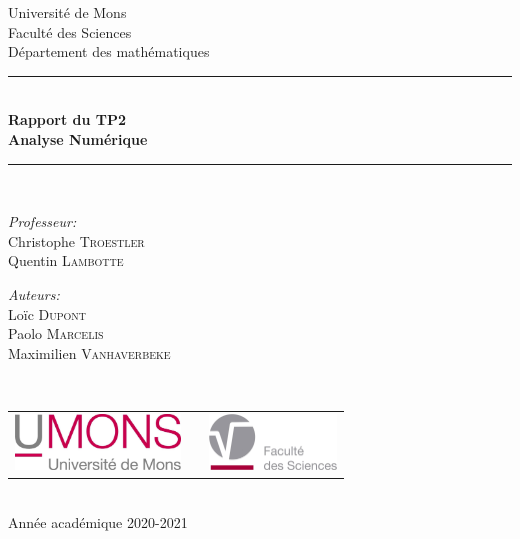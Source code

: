\documentclass[a4paper, 10pt]{article}
\begin{document}
\begin{titlepage}
\begin{center}

{\Large Université de Mons}\\[1ex]
{\Large Faculté des Sciences}\\[1ex]
{\Large Département des mathématiques}\\[2.5cm]

\newcommand{\HRule}{\rule{\linewidth}{0.3mm}}
\HRule \\[0.3cm]
{ \LARGE \bfseries Rapport du TP2 \\[0.3cm]}
{ \LARGE \bfseries Analyse Numérique \\[0.1cm]}
\HRule \\[1.5cm]

\begin{minipage}[t]{0.45\textwidth}
\begin{flushleft} \large
\emph{Professeur:}\\
Christophe \textsc{Troestler} \\
Quentin \textsc{Lambotte}
\end{flushleft}
\end{minipage}
\begin{minipage}[t]{0.45\textwidth}
\begin{flushright} \large
\emph{Auteurs:} \\
Loïc \textsc{Dupont} \\
Paolo \textsc{Marcelis} \\
Maximilien \textsc{Vanhaverbeke}
\end{flushright}
\end{minipage}\\[2ex]

\vfill

\begin{center}
\begin{tabular}[t]{c c c}
\includegraphics[height=1.5cm]{logoumons.jpg} &
\hspace{0.3cm} &
\includegraphics[height=1.5cm]{logofs.jpg}
\end{tabular}
\end{center}~\\
 
{\large Année académique 2020-2021}

\end{center}
\end{titlepage}
\end{document}

